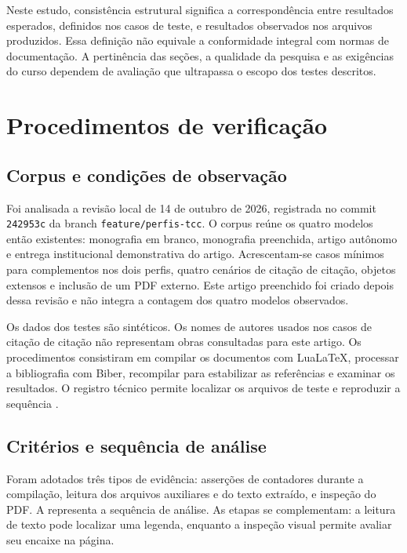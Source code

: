 Neste estudo, consistência estrutural significa a correspondência entre
resultados esperados, definidos nos casos de teste, e resultados observados
nos arquivos produzidos. Essa definição não equivale a conformidade integral
com normas de documentação. A pertinência das seções, a qualidade da pesquisa
e as exigências do curso dependem de avaliação que ultrapassa o escopo dos
testes descritos.

\section{Procedimentos de verificação}

\subsection{Corpus e condições de observação}

Foi analisada a revisão local de 14 de outubro de 2026, registrada no commit
\texttt{242953c} da branch \texttt{feature/perfis-tcc}. O corpus reúne os quatro
modelos então existentes: monografia em branco, monografia preenchida,
artigo autônomo e entrega institucional demonstrativa do artigo. Acrescentam-se
casos mínimos para complementos nos dois perfis, quatro cenários de citação
de citação, objetos extensos e inclusão de um PDF externo. Este artigo
preenchido foi criado depois dessa revisão e não integra a contagem dos
quatro modelos observados.

Os dados dos testes são sintéticos. Os nomes de autores usados nos casos de
citação de citação não representam obras consultadas para este artigo. Os
procedimentos consistiram em compilar os documentos com LuaLaTeX, processar
a bibliografia com Biber, recompilar para estabilizar as referências e
examinar os resultados. O registro técnico permite localizar os arquivos de
teste e reproduzir a sequência .

\subsection{Critérios e sequência de análise}

Foram adotados três tipos de evidência: asserções de contadores durante a
compilação, leitura dos arquivos auxiliares e do texto extraído, e inspeção
do PDF. A  representa a sequência de análise. As etapas
se complementam: a leitura de texto pode localizar uma legenda, enquanto a
inspeção visual permite avaliar seu encaixe na página.

